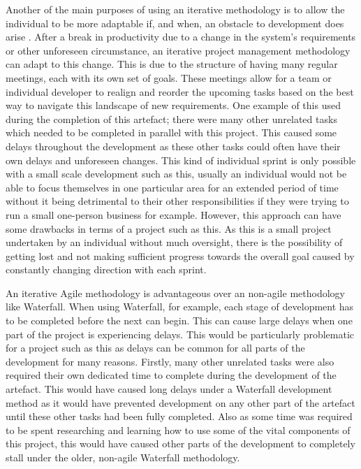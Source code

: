 \documentclass[11pt,a4paper]{report}
\begin{document}
Another of the main purposes of using an iterative methodology is to allow the individual to be more adaptable if, and when, an obstacle to development does arise \citep{Wiley_Project_Management}. After a break in productivity due to a change in the system's requirements or other unforeseen circumstance, an iterative project management methodology can adapt to this change. This is due to the structure of having many regular meetings, each with its own set of goals. These meetings allow for a team or individual developer to realign and reorder the upcoming tasks based on the best way to navigate this landscape of new requirements. One example of this used during the completion of this artefact; there were many other unrelated tasks which needed to be completed in parallel with this project. This caused some delays throughout the development as these other tasks could often have their own delays and unforeseen changes. This kind of individual sprint is only possible with a small scale development such as this, usually an individual would not be able to focus themselves in one particular area for an extended period of time without it being detrimental to their other responsibilities if they were trying to run a small one-person business for example. However, this approach can have some drawbacks in terms of a project such as this. As this is a small project undertaken by an individual without much oversight, there is the possibility of getting lost and not making sufficient progress towards the overall goal caused by constantly changing direction with each sprint.

An iterative Agile methodology is advantageous over an non-agile methodology like Waterfall. When using Waterfall, for example, each stage of development has to be completed before the next can begin. This can cause large delays when one part of the project is experiencing delays. This would be particularly problematic for a project such as this as delays can be common for all parts of the development for many reasons. Firstly, many other unrelated tasks were also required their own dedicated time to complete during the development of the artefact. This would have caused long delays under a Waterfall development method as it would have prevented development on any other part of the artefact until these other tasks had been fully completed. Also as some time was required to be spent researching and learning how to use some of the vital components of this project, this would have caused other parts of the development to completely stall under the older, non-agile Waterfall methodology. 
\end{document}
